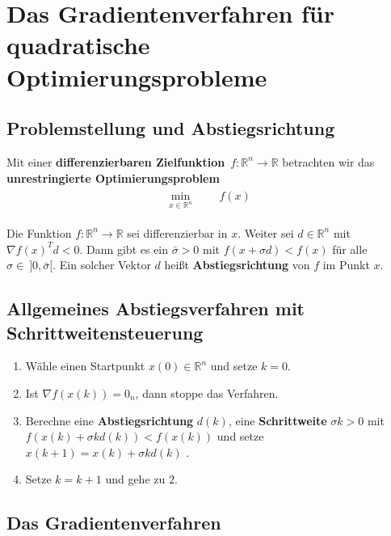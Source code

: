 \chapter{Das Gradientenverfahren für quadratische Optimierungsprobleme}

\section{Problemstellung und Abstiegsrichtung}

Mit einer \textbf{differenzierbaren Zielfunktion}\ $f:\mathbb{R}^n \rightarrow \mathbb{R}$ betrachten wir das \textbf{unrestringierte Optimierungsproblem}
\begin{gather}
\label{eq:P}
\tag{PU}
\begin{aligned}
\min_{x\in \mathbb{R}^n}
& & & f(x)
\end{aligned}
\end{gather}
\begin{Lemma}
	Die Funktion $f:\mathbb{R}^n \rightarrow \mathbb{R}$ sei differenzierbar in $x$. Weiter sei $d \in \mathbb{R}^n$ mit $\nabla f(x)^Td < 0$. Dann gibt es ein $\bar\sigma > 0$ mit $f(x + \sigma d) < f(x)$ f\"ur alle $\sigma \in\ ]0, \bar\sigma [$. Ein solcher Vektor $d$ heißt \textbf{Abstiegsrichtung} von $f$ im Punkt $x$.
\end{Lemma}

\section{Allgemeines Abstiegsverfahren mit Schrittweitensteuerung}

\begin{enumerate}
	\item Wähle einen Startpunkt $x(0) \in \mathbb{R}^n$ und setze $k = 0$.
	\item Ist $\nabla f(x(k)) = 0_n$, dann stoppe das Verfahren.
	\item Berechne eine \textbf{Abstiegsrichtung} $d(k)$, eine \textbf{Schrittweite} $\sigma k > 0$ mit\\
	$f(x(k)+\sigma k d(k)) < f(x(k))$ und setze $x(k+1) = x(k) + \sigma kd(k)$ .
	\item Setze $k = k + 1$ und gehe zu $2$.
\end{enumerate}

\section{Das Gradientenverfahren}

